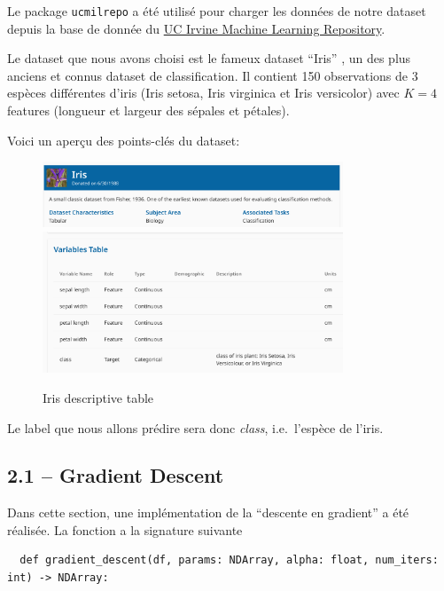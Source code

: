 \documentclass[
]{article}
\begin{document}
Le package \texttt{ucmilrepo} a été utilisé pour charger les données de
notre dataset depuis la base de donnée du
\href{https://archive.ics.uci.edu/ml/index}{UC Irvine Machine Learning
Repository}.

Le dataset que nous avons choisi est le fameux dataset ``Iris''
\cite{r.a.fisherIris1936}, un des plus anciens et connus dataset de
classification. Il contient 150 observations de 3 espèces différentes
d'iris (Iris setosa, Iris virginica et Iris versicolor) avec \(K = 4\)
features (longueur et largeur des sépales et pétales).

Voici un aperçu des points-clés du dataset:

\begin{figure}
\centering
\includegraphics[width=0.8\textwidth,height=\textheight]{../res/iris_img.png}
\includegraphics[width=0.8\textwidth,height=\textheight]{../res/iris_table.png}
\caption{Iris descriptive table}
\end{figure}

Le label que nous allons prédire sera donc \emph{class}, i.e.~l'espèce
de l'iris.

\newpage

\hypertarget{gradient-descent}{%
\subsection{2.1 -- Gradient Descent}\label{gradient-descent}}

Dans cette section, une implémentation de la ``descente en gradient'' a
été réalisée. La fonction a la signature suivante

\begin{lstlisting}
  def gradient_descent(df, params: NDArray, alpha: float, num_iters: int) -> NDArray:  
\end{lstlisting}
\end{document}
